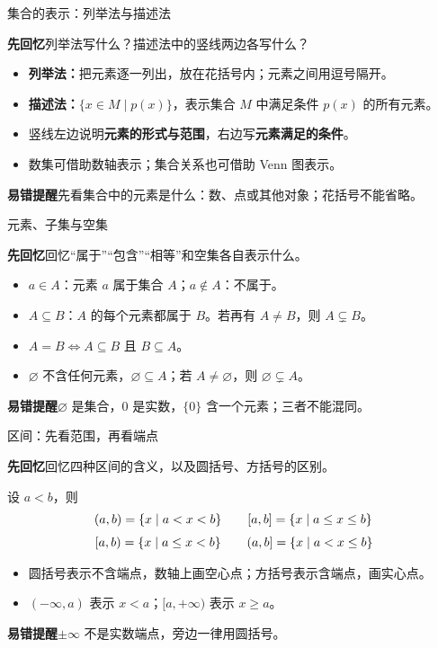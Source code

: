 \documentclass[UTF8,10pt,aspectratio=169]{ctexbeamer}
\newcommand{\Recall}[1]{\par\noindent\textcolor{KnowledgeBlue}{\textbf{先回忆}\quad #1}\par\vspace{0.3cm}}
\newcommand{\Pitfall}[1]{\par\vspace{0.22cm}\noindent\textbf{易错提醒}\quad #1\par}
\begin{document}
\begin{frame}[t]{集合的表示：列举法与描述法}
\large
\Recall{列举法写什么？描述法中的竖线两边各写什么？}
\pause
\begin{itemize}
  \item \textbf{列举法：}把元素逐一列出，放在花括号内；元素之间用逗号隔开。
  \item \textbf{描述法：}$\{x\in M\mid p(x)\}$，表示集合 $M$ 中满足条件 $p(x)$ 的所有元素。
  \item 竖线左边说明\textbf{元素的形式与范围}，右边写\textbf{元素满足的条件}。
  \item 数集可借助数轴表示；集合关系也可借助 Venn 图表示。
\end{itemize}
\Pitfall{先看集合中的元素是什么：数、点或其他对象；花括号不能省略。}
\end{frame}

\begin{frame}[t]{元素、子集与空集}
\large
\Recall{回忆“属于”“包含”“相等”和空集各自表示什么。}
\pause
\begin{itemize}
  \item $a\in A$：元素 $a$ 属于集合 $A$；$a\notin A$：不属于。
  \item $A\subseteq B$：$A$ 的每个元素都属于 $B$。若再有 $A\ne B$，则 $A\subsetneq B$。
  \item $A=B\iff A\subseteq B\text{ 且 }B\subseteq A$。
  \item $\varnothing$ 不含任何元素，$\varnothing\subseteq A$；若 $A\ne\varnothing$，则 $\varnothing\subsetneq A$。
\end{itemize}
\Pitfall{$\varnothing$ 是集合，$0$ 是实数，$\{0\}$ 含一个元素；三者不能混同。}
\end{frame}

\begin{frame}[t]{区间：先看范围，再看端点}
\large
\Recall{回忆四种区间的含义，以及圆括号、方括号的区别。}
\pause
设 $a<b$，则
\[
\begin{array}{c@{\qquad}c}
(a,b)=\{x\mid a<x<b\}&[a,b]=\{x\mid a\le x\le b\}\\[0.22cm]
[a,b)=\{x\mid a\le x<b\}&(a,b]=\{x\mid a<x\le b\}
\end{array}
\]
\begin{itemize}
  \item 圆括号表示不含端点，数轴上画空心点；方括号表示含端点，画实心点。
  \item $(-\infty,a)$ 表示 $x<a$；$[a,+\infty)$ 表示 $x\ge a$。
\end{itemize}
\Pitfall{$\pm\infty$ 不是实数端点，旁边一律用圆括号。}
\end{frame}
\end{document}
